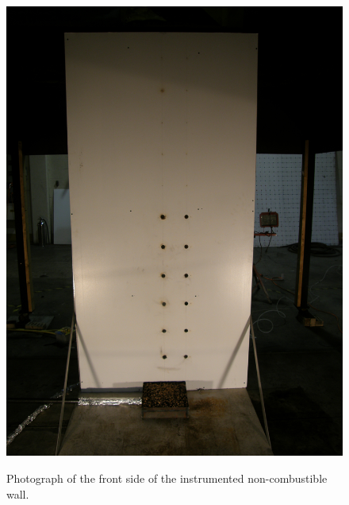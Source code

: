 \documentclass[twoside]{uocthesis}
\begin{document}
{{\begin{figure}
	\centering
	\includegraphics[width=\textwidth]{../Figures/Instrumented_Wall_Front_photo}\\
	\caption[Photograph of the front side of the instrumented non-combustible wall]{Photograph of the front side of the instrumented non-combustible wall.}
	\label{Instrumented_Wall_Front_photo}
\end{figure}

}}
\end{document}

